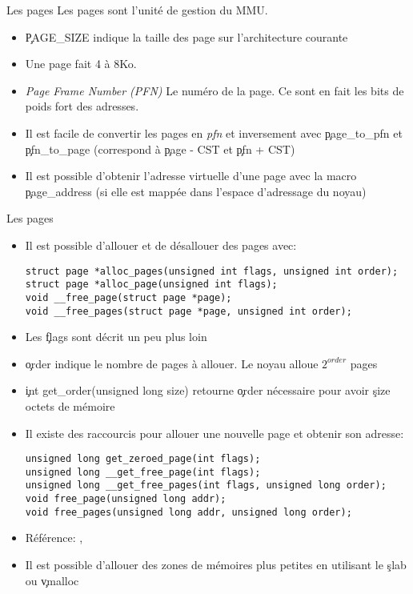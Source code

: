 \begin{frame}[fragile=singleslide]{Les pages}
  Les pages sont l'unité de gestion du MMU.
  \begin{itemize}
  \item \c{PAGE_SIZE}  indique la  taille des page  sur l'architecture
    courante
  \item Une page fait 4 à 8Ko.
  \item \emph{Page Frame  Number (PFN)} Le numéro de  la page. Ce sont
    en fait les bits de poids fort des adresses.
  \item  Il  est  facile  de  convertir les  pages  en  \emph{pfn}  et
    inversement avec \c{page_to_pfn}  et \c{pfn_to_page} (correspond à
    \c{page - CST} et \c{pfn + CST})
  \item Il est possible  d'obtenir l'adresse virtuelle d'une page avec
    la  macro  \c{page_address}  (si  elle est  mappée  dans  l'espace
    d'adressage du noyau)
  \end{itemize}
\end{frame}

\begin{frame}[fragile=singleslide]{Les pages}
  \begin{itemize}
  \item Il est possible d'allouer et de désallouer des pages avec:
    \begin{lstlisting}
struct page *alloc_pages(unsigned int flags, unsigned int order);
struct page *alloc_page(unsigned int flags);
void __free_page(struct page *page);
void __free_pages(struct page *page, unsigned int order);
    \end{lstlisting}
  \item Les \c{flags} sont décrit un peu plus loin
  \item  \c{order} indique  le nombre  de  pages à  allouer. Le  noyau
    alloue $2^{order}$ pages
  \item  \c{int  get_order(unsigned  long  size)}  retourne  \c{order}
    nécessaire pour avoir \c{size} octets de mémoire
  \item Il  existe des  raccourcis pour allouer  une nouvelle  page et
    obtenir son adresse:
    \begin{lstlisting}
unsigned long get_zeroed_page(int flags);
unsigned long __get_free_page(int flags);
unsigned long __get_free_pages(int flags, unsigned long order);
void free_page(unsigned long addr);
void free_pages(unsigned long addr, unsigned long order);
    \end{lstlisting}
  \item Référence: , 
  \item Il est  possible d'allouer des zones de  mémoires plus petites
    en utilisant le \c{slab} ou \c{vmalloc}
  \end{itemize}
\end{frame}

